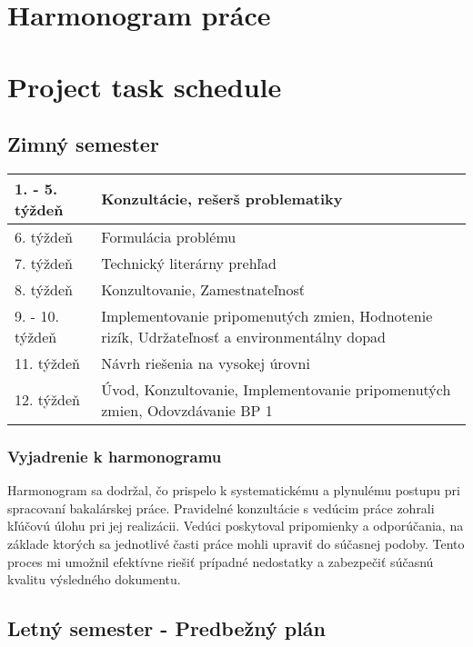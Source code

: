 \thispagestyle{empty}

\ifx\FIITlagEN\undefined
\chapter{Harmonogram práce}
\else
\chapter{Project task schedule}
\fi

\renewcommand*{\thepage}{B-\arabic{page}}

\section{Zimný semester}

\begin{tabular}{|p{2.8cm}||p{10.4cm}|}
\hline
1. - 5. týždeň    & Konzultácie, rešerš problematiky  \\
\hline
6. týždeň    & Formulácia problému \\
\hline
7. týždeň   & Technický literárny prehľad \\
\hline
8. týždeň                       & Konzultovanie, Zamestnateľnosť   \\
\hline
9. - 10. týždeň   & Implementovanie pripomenutých zmien,  Hodnotenie rizík, Udržateľnosť a environmentálny dopad  \\
\hline
11. týždeň  & Návrh riešenia na vysokej úrovni \\
\hline
12. týždeň & Úvod, Konzultovanie, Implementovanie pripomenutých zmien, Odovzdávanie BP 1 \\
\hline
\end{tabular}

\subsection{Vyjadrenie k harmonogramu}
\par{
Harmonogram sa dodržal, čo prispelo k systematickému a plynulému postupu pri spracovaní bakalárskej práce. Pravidelné konzultácie s vedúcim práce zohrali kľúčovú úlohu pri jej realizácii. Vedúci poskytoval pripomienky a odporúčania, na základe ktorých sa jednotlivé časti práce mohli upraviť do súčasnej podoby. Tento proces mi umožnil efektívne riešiť prípadné nedostatky a zabezpečiť súčasnú kvalitu výsledného dokumentu.
}

\section{Letný semester - Predbežný plán}

